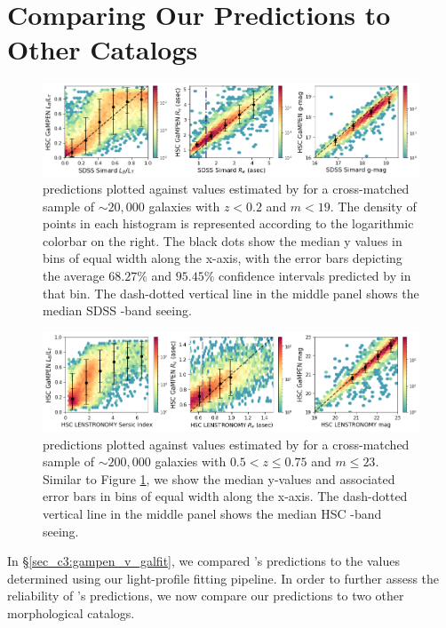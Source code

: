 \section{Comparing Our Predictions to Other Catalogs} \label{sec_c3:compare}

\begin{figure}[htb]
    \centering
    \includegraphics[width = \textwidth]{gampen_v_simard.png}
    \caption{\gampen{} predictions plotted against values estimated by \citet{simard_11} for a cross-matched sample of $\sim20,000$ galaxies with $z < 0.2$ and $m < 19$. The density of points in each histogram is represented according to the logarithmic colorbar on the right. The black dots show the median y values in bins of equal width along the x-axis, with the error bars depicting the average $68.27\%$ and $95.45\%$ confidence intervals predicted by \gampen{} in that bin. The dash-dotted vertical line in the middle panel shows the median SDSS \gb{}-band seeing.}
    \label{fig_c3:gampen_v_simard}
\end{figure}

\begin{figure}[htb]
    \centering
    \includegraphics[width = \textwidth]{gampen_v_lenstronomy.png}
    \caption{\gampen{} predictions plotted against values estimated by \citet{hsc_sersic} for a cross-matched sample of $\sim200,000$ galaxies with $0.5 < z \leq 0.75$ and $m \leq 23$. Similar to Figure \ref{fig_c3:gampen_v_simard}, we show the median y-values and associated error bars in bins of equal width along the x-axis. The dash-dotted vertical line in the middle panel shows the median HSC \ib{}-band seeing.}
    \label{fig_c3:gampen_v_lenstronomy}
\end{figure}

In \S \ref{sec_c3:gampen_v_galfit}, we compared \gampen{}'s predictions to the values determined using our light-profile fitting pipeline. In order to further assess the reliability of \gampen{}'s predictions, we now compare our predictions to two other morphological catalogs. 

